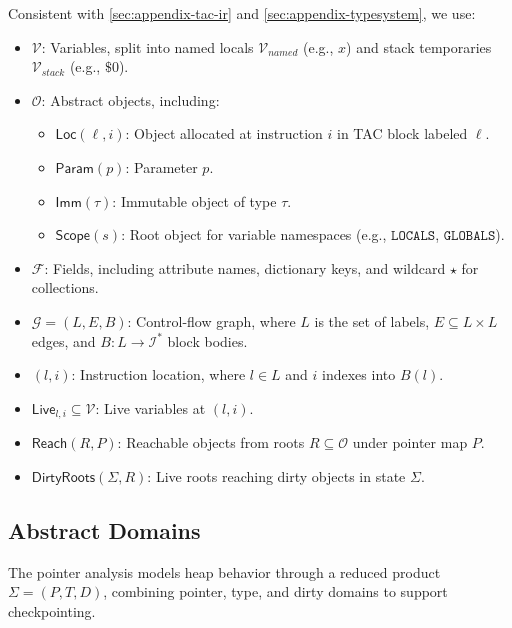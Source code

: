 Consistent with \autoref{sec:appendix-tac-ir} and \autoref{sec:appendix-typesystem}, we use:
\begin{itemize}
    \item $\mathcal{V}$: Variables, split into named locals $\mathcal{V}_{\mathit{named}}$ (e.g., $x$) and stack temporaries $\mathcal{V}_{\mathit{stack}}$ (e.g., $\$0$).
    \item $\mathcal{O}$: Abstract objects, including:
    \begin{itemize}
        \item $\mathsf{Loc}(\ell,i)$: Object allocated at instruction $i$ in TAC block labeled $\ell$.
        \item $\mathsf{Param}(p)$: Parameter $p$.
        \item $\mathsf{Imm}(\tau)$: Immutable object of type $\tau$.
        \item $\mathsf{Scope}(s)$: Root object for variable namespaces (e.g., $\mathtt{LOCALS}$, $\mathtt{GLOBALS}$).
    \end{itemize}
    \item $\mathcal{F}$: Fields, including attribute names, dictionary keys, and wildcard $\star$ for collections.
    \item $\mathcal{G} = (L, E, B)$: Control-flow graph, where $L$ is the set of labels, $E \subseteq L \times L$ edges, and $B: L \to \mathcal{I}^*$ block bodies.
    \item $(l, i)$: Instruction location, where $l \in L$ and $i$ indexes into $B(l)$.
    \item $\mathsf{Live}_{l,i} \subseteq \mathcal{V}$: Live variables at $(l,i)$.
    \item $\mathsf{Reach}(R, P)$: Reachable objects from roots $R \subseteq \mathcal{O}$ under pointer map $P$.
    \item $\mathsf{DirtyRoots}(\Sigma, R)$: Live roots reaching dirty objects in state $\Sigma$.
\end{itemize}

\subsection{Abstract Domains}

The pointer analysis models heap behavior through a reduced product $\Sigma = (P, T, D)$, combining pointer, type, and dirty domains to support checkpointing.

